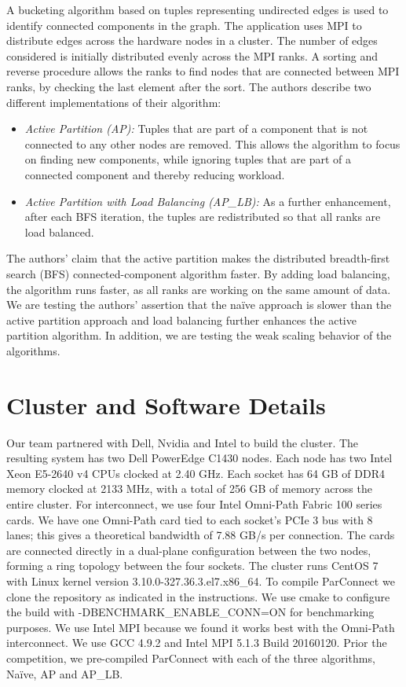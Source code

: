\documentclass[11pt]{elsarticle}
\begin{document}
A bucketing algorithm based on tuples representing undirected edges is used to identify connected components in the graph. 
The application uses MPI to distribute edges across the hardware nodes in a cluster.  The number of edges considered is initially
distributed evenly across the MPI ranks. A sorting and reverse procedure allows the ranks to find nodes that are connected between MPI
ranks, by checking the last element after the sort. 
The authors describe two different implementations of their algorithm:
\begin{itemize}
\item \textit{Active Partition (AP):}
Tuples that are part of a
component that is not connected to any other nodes are removed. This allows the algorithm to focus on finding new components, while
ignoring tuples that are part of a connected component and thereby reducing workload. 
\item \textit{Active Partition with Load Balancing (AP\_LB):}
As a further enhancement, after each BFS iteration, the tuples are redistributed so that all ranks are load balanced. 
\end{itemize}

The authors' claim that the active partition makes the distributed breadth-first search (BFS) connected-component algorithm faster.   By adding load balancing, the algorithm runs faster, as all ranks are working on the same amount of data. We are testing the authors' assertion that the na{\"i}ve approach is slower than the active partition approach and load balancing further enhances the active partition algorithm. In addition, we are testing the weak scaling behavior of the algorithms.

\section{Cluster and Software Details}
Our team partnered with Dell, Nvidia and Intel to build the cluster.  The resulting system
has two Dell PowerEdge C1430 nodes. Each node has two Intel Xeon E5-2640 v4 CPUs clocked at 2.40 GHz. Each socket has 64 GB of DDR4 memory clocked at 2133 MHz, with a total of 256 GB of memory across the entire cluster. For interconnect, we use four Intel Omni-Path Fabric 100 series cards. We have one Omni-Path card tied to each socket's PCIe 3 bus with 8 lanes; this gives a theoretical bandwidth of 7.88 GB/s per connection.  The cards are connected directly in a dual-plane configuration between the two nodes, forming a ring topology between the four sockets. The cluster runs CentOS 7 with Linux kernel version 3.10.0-327.36.3.el7.x86\_64.
 To compile ParConnect we clone the repository as indicated in the instructions. We use cmake to configure the build with
 -DBENCHMARK\_ENABLE\_CONN=ON for benchmarking purposes. We use Intel MPI because we found it works best with the Omni-Path interconnect.  We use GCC 4.9.2 and Intel MPI 5.1.3 Build 20160120. Prior the competition, we pre-compiled ParConnect with each of the three algorithms, Na{\"i}ve, AP and AP\_LB. 
 
\end{document}
